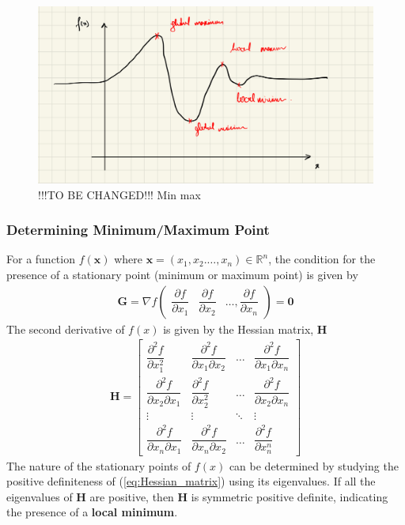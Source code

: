 \begin{figure}[ht]
    \centering
    \includegraphics[scale=0.15]{CHAPTER_3/c3_fig_min_max.jpeg}
    \caption{!!!TO BE CHANGED!!! Min max }
    \label{fig:min_max_illustration}
\end{figure}
\subsubsection*{Determining Minimum/Maximum Point}
For a function $f(\textbf{x})$ where $\textbf{x} = (x_1,x_2. \dots, x_n) \in \mathbb{R}^n$, the condition for the presence of a stationary point (minimum or maximum point) is given by
\begin{align}
    \label{eq:grad_f_x}
    \textbf{G} = \nabla f \begin{pmatrix}
        \dfrac{\partial f}{\partial x_1} & \dfrac{\partial f}{\partial x_2} & \dots , \dfrac{\partial f}{\partial x_n}
    \end{pmatrix} = \textbf{0}
\end{align}
The second derivative of $f(x)$ is given by the Hessian matrix, $\textbf{H}$
\begin{align}
    \label{eq:Hessian_matrix}
    \textbf{H} = \begin{bmatrix}
        \dfrac{\partial^2 f}{\partial x_1^2} & \dfrac{\partial^2 f}{\partial x_1 \partial x_2} & \dots & \dfrac{\partial^2 f}{\partial x_1 \partial x_n} \\
        \dfrac{\partial^2 f}{\partial x_2\partial x_1} & \dfrac{\partial^2 f}{\partial x_2^2} & \dots & \dfrac{\partial^2 f}{\partial x_2 \partial x_n} \\
        \vdots & \vdots & \ddots & \vdots \\
        \dfrac{\partial^2 f}{\partial x_n\partial x_1} & \dfrac{\partial^2 f}{\partial x_n \partial x_2} & \dots & \dfrac{\partial^2 f}{\partial x_n^n}
    \end{bmatrix}
\end{align}
The nature of the stationary points of $f(x)$ can be determined by studying the positive definiteness of (\ref{eq:Hessian_matrix}) using its eigenvalues. If all the eigenvalues of $\textbf{H}$ are positive, then $\textbf{H}$ is symmetric positive definite, indicating the presence of a \textbf{local minimum}.
